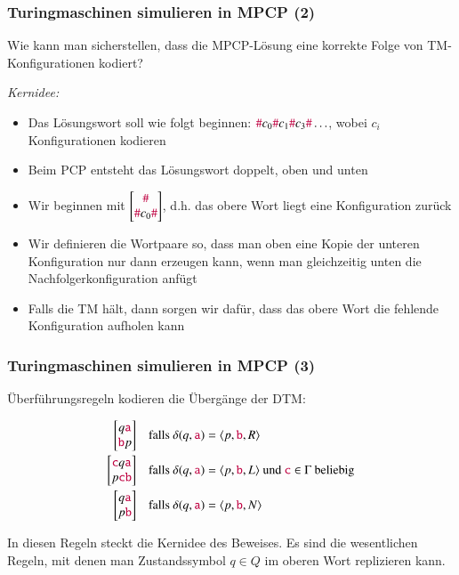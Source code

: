 \documentclass[onlymath]{beamer}
\begin{document}
\begin{frame}\frametitle{Turingmaschinen simulieren in MPCP (2)}

Wie kann man sicherstellen, dass die MPCP-Lösung eine korrekte Folge von TM-Konfigurationen kodiert?\bigskip\pause

\emph{Kernidee:}
\begin{itemize}
\item Das Lösungswort soll wie folgt beginnen: $\mathtt{\textcolor{purple}{\#}}c_0\mathtt{\textcolor{purple}{\#}}c_1\mathtt{\textcolor{purple}{\#}}c_3\mathtt{\textcolor{purple}{\#}}\ldots$, wobei $c_i$ Konfigurationen kodieren
\item Beim PCP entsteht das Lösungswort doppelt, oben und unten
\item Wir beginnen mit $\left[\begin{matrix}\mathtt{\textcolor{purple}{\#}}\\\mathtt{\textcolor{purple}{\#}}c_0\mathtt{\textcolor{purple}{\#}}\end{matrix}\right]$, d.h. das obere Wort liegt eine Konfiguration zurück
\item Wir definieren die Wortpaare so, dass man oben eine Kopie der unteren Konfiguration nur dann erzeugen kann, wenn man gleichzeitig unten die Nachfolgerkonfiguration anfügt
\item Falls die TM hält, dann sorgen wir dafür, dass das obere Wort die fehlende Konfiguration aufholen kann
\end{itemize}

\end{frame}

\begin{frame}\frametitle{Turingmaschinen simulieren in MPCP (3)}

\alert{Überführungsregeln} kodieren die Übergänge der DTM:

\begin{align*}
\left[\begin{matrix}q\mathtt{\textcolor{purple}{a}}\\\mathtt{\textcolor{purple}{b}}p\end{matrix}\right]\quad
	& \text{falls $\delta(q,\mathtt{\textcolor{purple}{a}})=\langle{p,\ensuremath{\mathtt{\textcolor{purple}{b}}},R}\rangle$}\\
\left[\begin{matrix}\mathtt{\textcolor{purple}{c}}q\mathtt{\textcolor{purple}{a}}\\p\mathtt{\textcolor{purple}{cb}}\end{matrix}\right]\quad
	& \text{falls $\delta(q,\mathtt{\textcolor{purple}{a}})=\langle{p,\ensuremath{\mathtt{\textcolor{purple}{b}}},L}\rangle$ und $\mathtt{\textcolor{purple}{c}}\in\Gamma$ beliebig}\\
\left[\begin{matrix}q\mathtt{\textcolor{purple}{a}}\\p\mathtt{\textcolor{purple}{b}}\end{matrix}\right]\quad
	& \text{falls $\delta(q,\mathtt{\textcolor{purple}{a}})=\langle{p,\ensuremath{\mathtt{\textcolor{purple}{b}}},N}\rangle$}
\end{align*}

In diesen Regeln steckt die Kernidee des Beweises. Es sind die wesentlichen Regeln, mit denen man Zustandssymbol $q\in Q$ im oberen Wort replizieren kann.

\end{frame}
\end{document}
